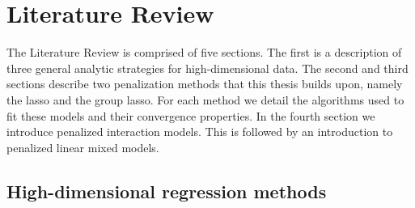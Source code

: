 \chapter{Literature Review\label{ch:litreview}}




\begin{comment}
It is easy to write more than you truly need, so try to keep it as limited as possible.  
(1) The problems of high dimension regressions such as overfitting and redundancy of variables.  
(2) then  penalization generally as a solution to (1).  
You might I suppose mention very briefly the alternative solutions like apriori dimension reduction or forward selection, but I would spend as little time as possible on other methods (acknowledging their existence merely and saying your thesis focuses on penalization).  
(3) then L1 methods including lasso \& group lasso (do you discuss elastic net? if so then you might need to include this too). Here I think you should be quite detailed in terms of the theory, how the penalization parameters are chosen, convergence, etc. 
(4) Then something about other structured L1 penalizations that have been proposed.  There are quite a few examples of penalties built for specific applications, and maybe you could find a few such examples and cite them. Not comprehensively.  Then you can point to the sail chapter as a new structured penalty.  
(5) A brief intro to linear mixed models followed by why naive penalization violates the normality of residuals to motivate your ggmix chapter.    I'd stop there
\end{comment}

The Literature Review is comprised of five sections. The first is a description of three general analytic strategies for high-dimensional data. The second and third sections describe two penalization methods that this thesis builds upon, namely the lasso and the group lasso. 
For each method we detail the algorithms used to fit these models and their convergence properties. In the fourth section we introduce penalized interaction models. This is followed by an introduction to penalized linear mixed models.



\section{High-dimensional regression methods}

